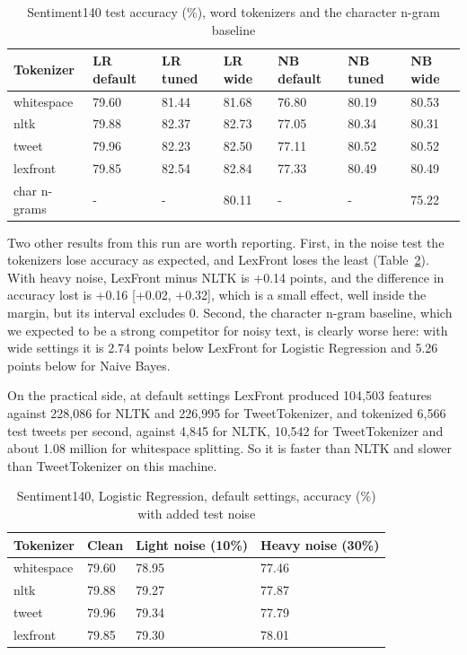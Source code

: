 \documentclass{ieeeaccess}
\begin{document}
\begin{table}[!tb]
\caption{Sentiment140 test accuracy (\%), word tokenizers and the character n-gram baseline}\label{tab:10}
\centering
\scriptsize
\setlength{\tabcolsep}{3pt}
\begin{tabular}{lllllll}
\toprule
\textbf{Tokenizer} & \textbf{LR default} & \textbf{LR tuned} & \textbf{LR wide} & \textbf{NB default} & \textbf{NB tuned} & \textbf{NB wide} \\
\midrule
whitespace & 79.60 & 81.44 & 81.68 & 76.80 & 80.19 & 80.53 \\
nltk & 79.88 & 82.37 & 82.73 & 77.05 & 80.34 & 80.31 \\
tweet & 79.96 & 82.23 & 82.50 & 77.11 & 80.52 & 80.52 \\
lexfront & 79.85 & 82.54 & 82.84 & 77.33 & 80.49 & 80.49 \\
char n-grams & - & - & 80.11 & - & - & 75.22 \\
\bottomrule
\end{tabular}
\end{table}

Two other results from this run are worth reporting. First, in the noise test the tokenizers lose accuracy as expected, and LexFront loses the least (Table~\ref{tab:11}). With heavy noise, LexFront minus NLTK is +0.14 points, and the difference in accuracy lost is +0.16 [+0.02, +0.32], which is a small effect, well inside the margin, but its interval excludes 0. Second, the character n-gram baseline, which we expected to be a strong competitor for noisy text, is clearly worse here: with wide settings it is 2.74 points below LexFront for Logistic Regression and 5.26 points below for Naive Bayes.

On the practical side, at default settings LexFront produced 104,503 features against 228,086 for NLTK and 226,995 for TweetTokenizer, and tokenized 6,566 test tweets per second, against 4,845 for NLTK, 10,542 for TweetTokenizer and about 1.08 million for whitespace splitting. So it is faster than NLTK and slower than TweetTokenizer on this machine.

\begin{table}[!t]
\caption{Sentiment140, Logistic Regression, default settings, accuracy (\%) with added test noise}\label{tab:11}
\centering
\scriptsize
\setlength{\tabcolsep}{3pt}
\begin{tabular}{llll}
\toprule
\textbf{Tokenizer} & \textbf{Clean} & \textbf{Light noise (10\%)} & \textbf{Heavy noise (30\%)} \\
\midrule
whitespace & 79.60 & 78.95 & 77.46 \\
nltk & 79.88 & 79.27 & 77.87 \\
tweet & 79.96 & 79.34 & 77.79 \\
lexfront & 79.85 & 79.30 & 78.01 \\
\bottomrule
\end{tabular}
\end{table}
\end{document}
